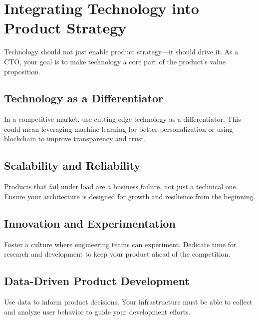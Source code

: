 \section{Integrating Technology into Product Strategy}

Technology should not just enable product strategy—it should drive it. As a \gls{CTO}, your goal is to make technology a core part of the product's value proposition.

\subsection{Technology as a Differentiator}

In a competitive market, use cutting-edge technology as a differentiator. This could mean leveraging machine learning for better personalization or using blockchain to improve transparency and trust.

\subsection{Scalability and Reliability}

Products that fail under load are a business failure, not just a technical one. Ensure your architecture is designed for growth and resilience from the beginning.

\subsection{Innovation and Experimentation}

Foster a culture where engineering teams can experiment. Dedicate time for research and development to keep your product ahead of the competition.

\subsection{Data-Driven Product Development}

Use data to inform product decisions. Your infrastructure must be able to collect and analyze user behavior to guide your development efforts.
